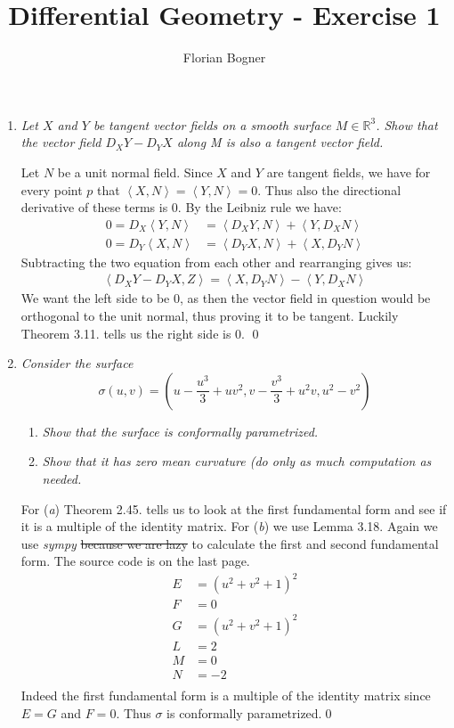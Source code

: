 \documentclass[a4paper,11pt,notitlepage,fullpage]{article}
\newcommand{\la}{\left\langle}
\newcommand{\ra}{\right\rangle}
\begin{document}
\author{Florian Bogner}
\title{Differential Geometry - Exercise 1}
\maketitle


\begin{enumerate}
\item \emph{Let $X$ and $Y$ be tangent vector fields on a smooth surface $M \in \mathbb R^3$. Show that the vector field $D_X Y - D_Y X$ along M is also a tangent vector field.}

Let $N$ be a unit normal field. Since $X$ and $Y$ are tangent fields, we have for every point $p$ that $\left\langle X, N \right\rangle = \left\langle Y, N \right\rangle = 0$. Thus also the directional derivative of these terms is $0$. By the Leibniz rule we have:
\begin{align*}
0 = D_X\left\langle Y, N \right\rangle &= \la D_X Y, N \ra + \la Y, D_X N \ra \\
0 = D_Y\left\langle X, N \right\rangle &= \la D_Y X, N \ra + \la X, D_Y N \ra
\end{align*}
Subtracting the two equation from each other and rearranging gives us:
\begin{align*}
\la D_X Y - D_Y X, Z \ra = \la X, D_Y N \ra - \la Y, D_X N \ra
\end{align*}
We want the left side to be $0$, as then the vector field in question would be orthogonal to the unit normal, thus proving it to be tangent. Luckily Theorem 3.11. tells us the right side is $0$. \qed

\item \emph{Consider the surface}
\begin{equation*}
\sigma(u,v) = (u - \frac{u^3}{3} + uv^2, v - \frac{v^3}{3} + u^2v, u^2 - v^2)
\end{equation*}
\begin{enumerate}
\item \emph{Show that the surface is conformally parametrized.}
\item \emph{Show that it has zero mean curvature (do only as much computation as needed.}
\end{enumerate}

For (\emph a) Theorem 2.45. tells us to look at the first fundamental form and see if it is a multiple of the identity matrix. For (\emph b) we use Lemma 3.18. Again we use \emph{sympy} \sout{because we are lazy} to calculate the first and second fundamental form. The source code is on the last page.
\begin{align*}
E &= \left(u^{2} + v^{2} + 1\right)^{2} \\
F &= 0 \\
G &= \left(u^{2} + v^{2} + 1\right)^{2} \\
L &= 2 \\
M &= 0 \\
N &= -2 \\
\end{align*}
Indeed the first fundamental form is a multiple of the identity matrix since $E = G$ and $F = 0$. Thus $\sigma$ is conformally parametrized.\qed


\end{enumerate}
\end{document}
